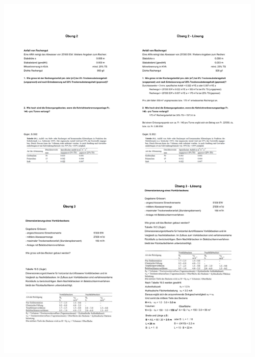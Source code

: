 \documentclass[9pt, openright=false]{scrartcl}
\begin{document}
\begin{center}
\includegraphics[width=\textwidth]{images/uebung23}
\end{center} 
\end{document}
